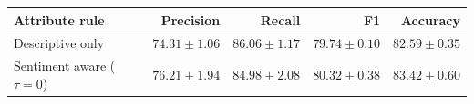 \begin{tabular}{lrrrr}
\toprule
Attribute rule & Precision & Recall & F1 & Accuracy \\
\midrule
Descriptive only & $74.31\pm1.06$ & $86.06\pm1.17$ & $79.74\pm0.10$ & $82.59\pm0.35$ \\
Sentiment aware ($\tau=0$) & $76.21\pm1.94$ & $84.98\pm2.08$ & $80.32\pm0.38$ & $83.42\pm0.60$ \\
\bottomrule
\end{tabular}
